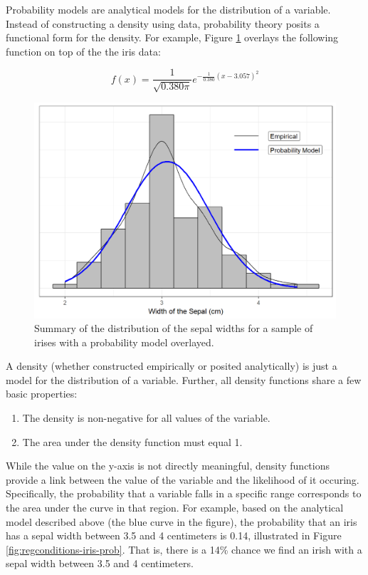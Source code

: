\documentclass[]{book}
\providecommand{\tightlist}{%
  \setlength{\itemsep}{0pt}\setlength{\parskip}{0pt}}
\theoremstyle{plain}
\theoremstyle{mydefn}
\theoremstyle{myexmpl}
\theoremstyle{remark}
\begin{document}
Probability models are analytical models for the distribution of a
variable. Instead of constructing a density using data, probability
theory posits a functional form for the density. For example, Figure
\ref{fig:regconditions-iris-normal} overlays the following function on
top of the the iris data:

\[f(x) = \frac{1}{\sqrt{0.380\pi}} e^{-\frac{1}{0.380}(x - 3.057)^2}\]

\begin{figure}

{\centering \includegraphics[width=0.8\linewidth]{./Images/regconditions-iris-normal-1} 

}

\caption{Summary of the distribution of the sepal widths for a sample of irises with a probability model overlayed.}\label{fig:regconditions-iris-normal}
\end{figure}

A density (whether constructed empirically or posited analytically) is
just a model for the distribution of a variable. Further, all density
functions share a few basic properties:

\begin{enumerate}
\def\labelenumi{\arabic{enumi}.}
\tightlist
\item
  The density is non-negative for all values of the variable.
\item
  The area under the density function must equal 1.
\end{enumerate}

While the value on the y-axis is not directly meaningful, density
functions provide a link between the value of the variable and the
likelihood of it occuring. Specifically, the probability that a variable
falls in a specific range corresponds to the area under the curve in
that region. For example, based on the analytical model described above
(the blue curve in the figure), the probability that an iris has a sepal
width between 3.5 and 4 centimeters is 0.14, illustrated in Figure
\ref{fig:regconditions-iris-prob}. That is, there is a 14\% chance we
find an irish with a sepal width between 3.5 and 4 centimeters.
\end{document}
